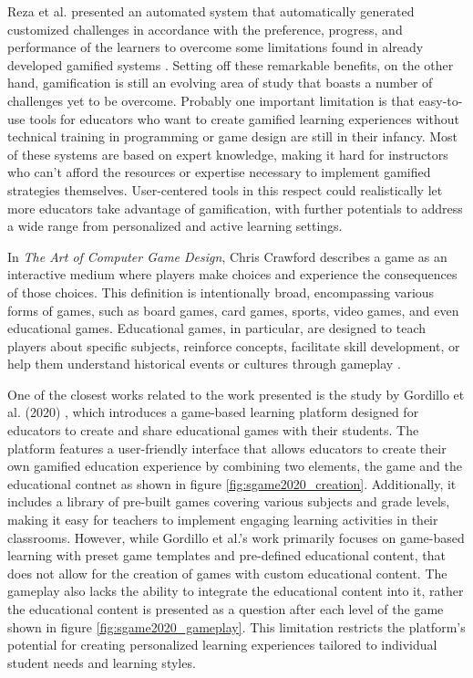 Reza et al. presented an automated system that automatically generated customized challenges in accordance with the preference, progress, and performance of the learners to overcome some limitations found in already developed gamified systems \cite{khoshkangini2021}. Setting off these remarkable benefits, on the other hand, gamification is still an evolving area of study that boasts a number of challenges yet to be overcome. Probably one important limitation is that easy-to-use tools for educators who want to create gamified learning experiences without technical training in programming or game design are still in their infancy. Most of these systems are based on expert knowledge, making it hard for instructors who can't afford the resources or expertise necessary to implement gamified strategies themselves. User-centered tools in this respect could realistically let more educators take advantage of gamification, with further potentials to address a wide range from personalized and active learning settings.

In \emph{The Art of Computer Game Design}, Chris Crawford describes a game as an interactive medium where players make choices and experience the consequences of those choices. This definition is intentionally broad, encompassing various forms of games, such as board games, card games, sports, video games, and even educational games. Educational games, in particular, are designed to teach players about specific subjects, reinforce concepts, facilitate skill development, or help them understand historical events or cultures through gameplay \cite{crawford1982art}.

One of the closest works related to the work presented is the study by Gordillo et al. (2020) \cite{sgame2020}, which introduces a game-based learning platform designed for educators to create and share educational games with their students. The platform features a user-friendly interface that allows educators to create their own gamified education experience by combining two elements, the game and the educational contnet as shown in figure \ref{fig:sgame2020_creation}. Additionally, it includes a library of pre-built games covering various subjects and grade levels, making it easy for teachers to implement engaging learning activities in their classrooms. However, while Gordillo et al.’s work primarily focuses on game-based learning with preset game templates and pre-defined educational content, that does not allow for the creation of games with custom educational content. The gameplay also lacks the ability to integrate the educational content into it, rather the educational content is presented as a question after each level of the game shown in figure \ref{fig:sgame2020_gameplay}. This limitation restricts the platform’s potential for creating personalized learning experiences tailored to individual student needs and learning styles.


